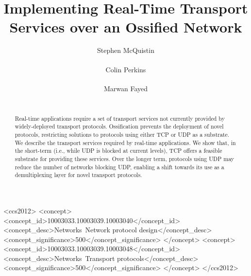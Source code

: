 \documentclass[10pt]{sig-alternate-05-2015}
\begin{document}
\title{Implementing Real-Time Transport Services over an Ossified Network}
\author{
  \alignauthor
    Stephen McQuistin\\
    \\
  \alignauthor
    Colin Perkins\\
    \\
  \alignauthor
    Marwan Fayed\\
    \\
}

\toappear{}
\maketitle
\begin{abstract}


Real-time applications require a set of transport services not currently
provided by widely-deployed transport protocols. Ossification prevents the
deployment of novel protocols, restricting solutions to protocols using
either TCP or UDP as a substrate. We describe the transport services
required by real-time applications. We show that, in the short-term (i.e.,
while UDP is blocked at current levels), TCP offers a feasible substrate
for providing these services. Over the longer term, protocols using UDP
may reduce the number of networks blocking UDP, enabling a shift towards
its use as a demultiplexing layer for novel transport protocols.

\end{abstract}
\begin{CCSXML}
  <ccs2012>
    <concept>
      <concept_id>10003033.10003039.10003040</concept_id>
      <concept_desc>Networks~Network protocol design</concept_desc>
      <concept_significance>500</concept_significance>
    </concept>
    <concept>
      <concept_id>10003033.10003039.10003048</concept_id>
      <concept_desc>Networks~Transport protocols</concept_desc>
      <concept_significance>500</concept_significance>
    </concept>
  </ccs2012>
\end{CCSXML}
\end{document}
